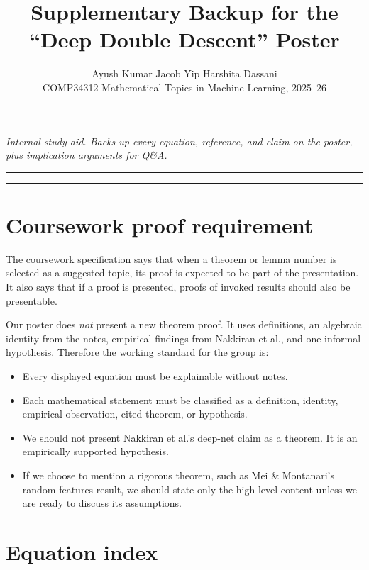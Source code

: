 \documentclass[11pt,a4paper]{article}
\title{Supplementary Backup for the\\``Deep Double Descent'' Poster}
\author{Ayush Kumar \quad Jacob Yip \quad Harshita Dassani \\[2pt]
\small COMP34312 Mathematical Topics in Machine Learning, 2025--26}
\date{}
\theoremstyle{definition}
\begin{document}
\maketitle
\vspace{-2.5em}

\begin{center}
\textit{Internal study aid. Backs up every equation, reference, and claim on the poster, plus implication arguments for Q\&A.}
\end{center}

\hrule
\vspace{0.6em}

\tableofcontents
\vspace{0.4em}
\hrule

\section{Coursework proof requirement}

The coursework specification says that when a theorem or lemma number is selected as a suggested topic, its proof is expected to be part of the presentation. It also says that if a proof is presented, proofs of invoked results should also be presentable.

Our poster does \emph{not} present a new theorem proof. It uses definitions, an algebraic identity from the notes, empirical findings from Nakkiran et al., and one informal hypothesis. Therefore the working standard for the group is:
\begin{itemize}[leftmargin=1.2em]
\item Every displayed equation must be explainable without notes.
\item Each mathematical statement must be classified as a definition, identity, empirical observation, cited theorem, or hypothesis.
\item We should not present Nakkiran et al.'s deep-net claim as a theorem. It is an empirically supported hypothesis.
\item If we choose to mention a rigorous theorem, such as Mei \& Montanari's random-features result, we should state only the high-level content unless we are ready to discuss its assumptions.
\end{itemize}

\section{Equation index}
\end{document}
